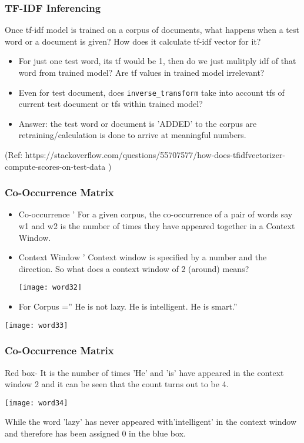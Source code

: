 \begin{frame}[fragile]\frametitle{TF-IDF Inferencing}
Once tf-idf model is trained on a corpus of documents, what happens when a test word or a document is given? How does it calculate tf-idf vector for it?
\begin{itemize}
\item For just one test word, its tf would be 1, then do we just mulitply idf of that word from trained model? Are tf values in trained model irrelevant?
\item Even for test document, does \lstinline|inverse_transform| take into account tfs of current test document or tfs within trained model?
\item Answer: the test word or document is 'ADDED' to the corpus are retraining/calculation is done to arrive at meaningful numbers.
\end{itemize}

{\tiny (Ref: https://stackoverflow.com/questions/55707577/how-does-tfidfvectorizer-compute-scores-on-test-data )}
\end{frame}

\begin{frame}[fragile]\frametitle{Co-Occurrence Matrix}
\begin{itemize}
\item Co-occurrence ' For a given corpus, the co-occurrence of a pair of words say w1 and w2 is the number of times they have appeared together in a Context Window.
\item Context Window ' Context window is specified by a number and the direction. So what does a context window of 2 (around) means?
\begin{center}
\texttt{[image: word32]}
\end{center}
\item For Corpus ='' He is not lazy. He is intelligent. He is smart.''
\end{itemize}
\begin{center}
\texttt{[image: word33]}
\end{center}
\end{frame}

\begin{frame}[fragile]\frametitle{Co-Occurrence Matrix}
Red box- It is the number of times 'He' and 'is' have appeared in the context window 2 and it can be seen that the count turns out to be 4. 
\begin{center}
\texttt{[image: word34]}
\end{center}
While the word 'lazy' has never appeared with'intelligent' in the context window and therefore has been assigned 0 in the blue box.
\end{frame}



